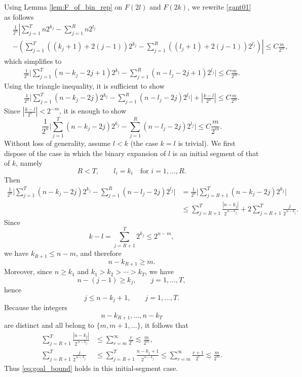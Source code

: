 \documentclass[11pt]{amsart}
\theoremstyle{definition}
\renewcommand{\1}{{\mathbbm{1}}}
\begin{document}
Using Lemma \ref{lem:F_of_bin_rep} on $F(2l)$ and $F(2k)$, 
we rewrite \eqref{gant01} as follows
\begin{align*}
    &\frac{1}{{2^n}}
    \left| 
    \sum_{j=1}^{T}n2^{k_j} - \sum_{j=1}^{R}n2^{l_j}
     \right.\\
     &\left. -\left(
    \sum_{j=1}^{T}((k_j+1)+2(j-1))2^{k_j}
    -\sum_{j=1}^{R}((l_j+1)+2(j-1))2^{l_j}
    \right)
    \right|
    \leq C\frac{m}{2^{m}},
\end{align*}
which simplifies to
\begin{align*}
    \frac{1}{{2^n}}
    \Bigg|
    \sum_{j=1}^{T}(n - k_j- 2j +1 )2^{k_j}
    -\sum_{j=1}^{R}( n - l_j- 2j+1 )2^{l_j}
    \Bigg|
    \leq C\frac{m}{2^{m}}.
\end{align*}
Using the triangle inequality, it is sufficient to show
\begin{align*}
    \frac{1}{{2^n}}
    \Bigg|
    \sum_{j=1}^{T}(n - k_j- 2j  )2^{k_j}
    -\sum_{j=1}^{R}( n - l_j- 2j )2^{l_j}
    \Bigg|
    + \left|\frac{k-l}{2^n}\right|
    \leq C\frac{m}{2^{m}}.
\end{align*}
Since $ \left|\frac{k-l}{2^n}\right|<2^{-m}$, it is enough to show 
\begin{equation}\label{eq:goal_bound}
        \frac{1}{{2^n}}
    \Bigg|
    \sum_{j=1}^{T}(n - k_j- 2j  )2^{k_j}
    -\sum_{j=1}^{R}( n - l_j- 2j )2^{l_j}
    \Bigg|
    \leq C\frac{m}{2^{m}}.
\end{equation}
Without loss of generality, assume $l<k$ (the case $k=l$ is trivial).
We first dispose of the case in which the binary expansion of $l$ is an initial segment of that of $k$, namely
\[
R<T,
\qquad
l_i=k_i \quad \text{for } i=1,\dots,R.
\]
Then
\begin{align*}
\frac{1}{{2^n}}
\Bigg|
\sum_{j=1}^{T}(n - k_j- 2j )2^{k_j}
-\sum_{j=1}^{R}( n - l_j- 2j )2^{l_j}
\Bigg|
&=
\frac{1}{{2^n}}
\Bigg|
\sum_{j=R+1}^{T}(n - k_j- 2j )2^{k_j}
\Bigg|\\
&\le
\sum_{j=R+1}^{T}\frac{|n-k_j|}{2^{\,n-k_j}}
+
2\sum_{j=R+1}^{T}\frac{j}{2^{\,n-k_j}}.
\end{align*}
Since
\[
k-l=\sum_{j=R+1}^{T}2^{k_j}\le 2^{n-m},
\]
we have $k_{R+1}\le n-m$, and therefore
\[
n-k_{R+1}\ge m.
\]
Moreover, since $n\ge k_1$ and $k_1>k_2>\cdots>k_T$, we have
\[
n-(j-1)\ge k_j,
\qquad j=1,\dots,T,
\]
hence
\[
j\le n-k_j+1,
\qquad j=1,\dots,T.
\]
Because the integers
\[
n-k_{R+1},\dots,n-k_T
\]
are distinct and all belong to $\{m,m+1,\dots\}$, it follows that
\begin{align*}
\sum_{j=R+1}^{T}\frac{|n-k_j|}{2^{\,n-k_j}}
&\le \sum_{r=m}^{\infty}\frac{r}{2^r}
\lesssim \frac{m}{2^m},\\
\sum_{j=R+1}^{T}\frac{j}{2^{\,n-k_j}}
&\le \sum_{j=R+1}^{T}\frac{n-k_j+1}{2^{\,n-k_j}}
\le \sum_{r=m}^{\infty}\frac{r+1}{2^r}
\lesssim \frac{m}{2^m}.
\end{align*}
Thus \eqref{eq:goal_bound} holds in this initial-segment case.
\end{document}
